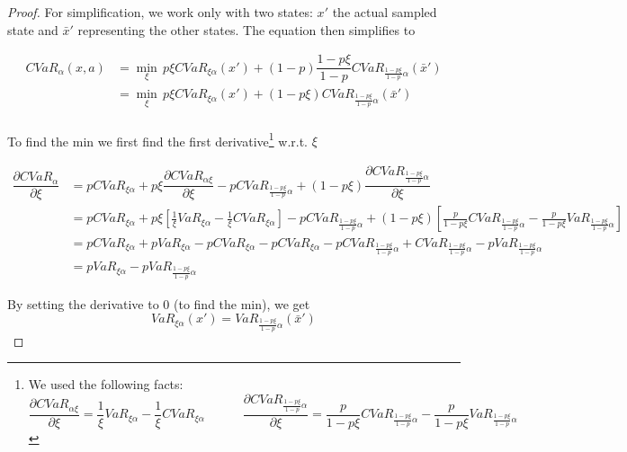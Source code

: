 \begin{proof}
For simplification, we work only with two states: $x'$ the actual sampled state and $\bar{x}'$ representing the other states. The equation then simplifies to

\begin{equation}\label{eq:cvardecomp2}
\begin{split}
CVaR_\alpha(x, a)&=\min_{\xi} \, p\xi CVaR_{\xi\alpha}(x') + (1-p)\dfrac{1-p\xi}{1-p}CVaR_{\frac{1-p\xi}{1-p}\alpha}(\bar{x}')\\
&=\min_{\xi} \, p\xi CVaR_{\xi\alpha}(x') + (1-p\xi)CVaR_{\frac{1-p\xi}{1-p}\alpha}(\bar{x}')\\
\end{split}
\end{equation}

To find the min we first find the first derivative\footnote{
We used the following facts:
\begin{equation*}
\dfrac{\partial CVaR_{\alpha\xi}}{\partial \xi} = \frac{1}{\xi}VaR_{\xi\alpha}-\frac{1}{\xi}CVaR_{\xi\alpha}\quad\quad\quad
\dfrac{\partial CVaR_{\frac{1-p\xi}{1-p}\alpha}}{\partial\xi} = \frac{p}{1-p\xi}CVaR_{\frac{1-p\xi}{1-p}\alpha}	-	\frac{p}{1-p\xi}VaR_{\frac{1-p\xi}{1-p}\alpha}
\end{equation*}
} w.r.t. $\xi$

\begin{equation}\label{eq:varvar}
\begin{split}
\dfrac{\partial CVaR_\alpha}{\partial \xi} &= pCVaR_{\xi\alpha} + p\xi \dfrac{\partial CVaR_{\alpha\xi}}{\partial \xi} - pCVaR_{\frac{1-p\xi}{1-p}\alpha} + (1 - p\xi)\dfrac{\partial CVaR_{\frac{1-p\xi}{1-p}\alpha}}{\partial\xi}\\
&= pCVaR_{\xi\alpha} + p\xi\left[	\frac{1}{\xi}VaR_{\xi\alpha}-\frac{1}{\xi}CVaR_{\xi\alpha}	\right] - pCVaR_{\frac{1-p\xi}{1-p}\alpha} + (1-p\xi)\left[	\frac{p}{1-p\xi}CVaR_{\frac{1-p\xi}{1-p}\alpha}	-	\frac{p}{1-p\xi}VaR_{\frac{1-p\xi}{1-p}\alpha}\right]\\
&= pCVaR_{\xi\alpha} + pVaR_{\xi\alpha} - pCVaR_{\xi\alpha} - pCVaR_{\xi\alpha} - pCVaR_{\frac{1-p\xi}{1-p}\alpha} + CVaR_{\frac{1-p\xi}{1-p}\alpha} - pVaR_{\frac{1-p\xi}{1-p}\alpha}\\
&= pVaR_{\xi\alpha} - pVaR_{\frac{1-p\xi}{1-p}\alpha}
\end{split}
\end{equation}

By setting the derivative to 0 (to find the min), we get
\begin{equation}\label{eq:varvar}
VaR_{\xi\alpha}(x')= VaR_{\frac{1-p\xi}{1-p}\alpha}(\bar{x}')
\end{equation}


\end{proof}
